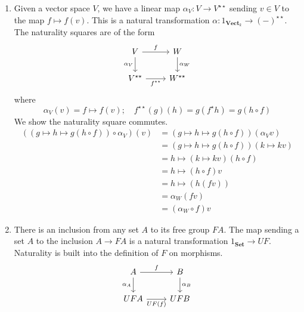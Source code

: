 \begin{example}
    \begin{enumerate}
        \item Given a vector space \( V \), we have a linear map \( \alpha_V : V \to V^{\star\star} \) sending \( v \in V \) to the map \( f \mapsto f(v) \).
        This is a natural transformation \( \alpha : 1_{\mathbf{Vect}_k} \to (-)^{\star\star} \).
        The naturality squares are of the form
        \[\begin{tikzcd}
            V & W \\
            {V^{\star\star}} & {W^{\star\star}}
            \arrow["f", from=1-1, to=1-2]
            \arrow["{\alpha_W}", from=1-2, to=2-2]
            \arrow["{\alpha_V}"', from=1-1, to=2-1]
            \arrow["{f^{\star\star}}"', from=2-1, to=2-2]
        \end{tikzcd}\]
        where
        \[ \alpha_V(v) = f \mapsto f(v);\quad f^{\star\star}(g)(h) = g (f^\star h) = g (h \circ f) \]
        We show the naturality square commutes.
        \begin{align*}
            ((g \mapsto h \mapsto g(h \circ f)) \circ \alpha_V)(v) &= (g \mapsto h \mapsto g(h \circ f))(\alpha_V v) \\
            &= (g \mapsto h \mapsto g(h \circ f))(k \mapsto k v) \\
            &= h \mapsto (k \mapsto k v)(h \circ f) \\
            &= h \mapsto (h \circ f) v \\
            &= h \mapsto (h (fv)) \\
            &= \alpha_W (fv) \\
            &= (\alpha_W \circ f) v
        \end{align*}
        \item There is an inclusion from any set \( A \) to its free group \( FA \).
        The map sending a set \( A \) to the inclusion \( A \to FA \) is a natural transformation \( 1_{\mathbf{Set}} \to UF \).
        Naturality is built into the definition of \( F \) on morphisms.
        \[\begin{tikzcd}
            A & B \\
            UFA & UFB
            \arrow["f", from=1-1, to=1-2]
            \arrow["{\alpha_B}", from=1-2, to=2-2]
            \arrow["{\alpha_A}"', from=1-1, to=2-1]
            \arrow["{UF(f)}"', from=2-1, to=2-2]
        \end{tikzcd}\]

\end{enumerate}
\end{example}
